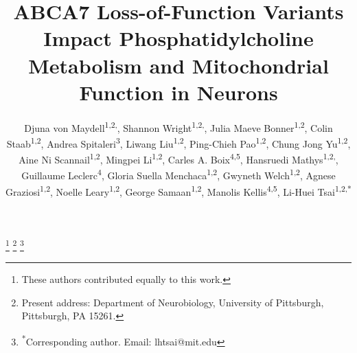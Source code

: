 \title{ABCA7 Loss-of-Function Variants Impact Phosphatidylcholine Metabolism and Mitochondrial Function in Neurons}

\author{%
  \parbox{\textwidth}{%
    Djuna von Maydell\textsuperscript{1,2,\textdagger}, 
    Shannon Wright\textsuperscript{1,2,\textdagger}, 
    Julia Maeve Bonner\textsuperscript{1,2}, 
    Colin Staab\textsuperscript{1,2}, 
    Andrea Spitaleri\textsuperscript{3}, 
    Liwang Liu\textsuperscript{1,2}, 
    Ping-Chieh Pao\textsuperscript{1,2}, 
    Chung Jong Yu\textsuperscript{1,2}, 
    Aine Ni Scannail\textsuperscript{1,2}, 
    Mingpei Li\textsuperscript{1,2}, 
    Carles A. Boix\textsuperscript{4,5}, 
    Hansruedi Mathys\textsuperscript{1,2,\textdaggerdbl}, 
    Guillaume Leclerc\textsuperscript{4}, 
    Gloria Suella Menchaca\textsuperscript{1,2}, 
    Gwyneth Welch\textsuperscript{1,2}, 
    Agnese Graziosi\textsuperscript{1,2}, 
    Noelle Leary\textsuperscript{1,2}, 
    George Samaan\textsuperscript{1,2}, 
    Manolis Kellis\textsuperscript{4,5}, 
    Li-Huei Tsai\textsuperscript{1,2,*}
  }%
}

\date{}
\maketitle


\thanks{\textsuperscript{\textdagger}These authors contributed equally to this work.}
\thanks{\textsuperscript{\textdaggerdbl}Present address: Department of Neurobiology, University of Pittsburgh, Pittsburgh, PA 15261.}
\thanks{\textsuperscript{*}Corresponding author. Email: lhtsai@mit.edu}

